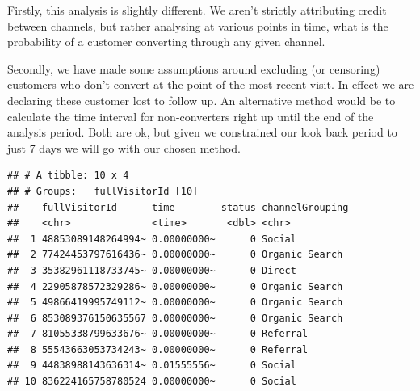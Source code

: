 \documentclass[]{book}
\newenvironment{Shaded}{\begin{snugshade}}{\end{snugshade}}
\newcommand{\KeywordTok}[1]{\textcolor[rgb]{0.13,0.29,0.53}{\textbf{#1}}}
\newcommand{\DataTypeTok}[1]{\textcolor[rgb]{0.13,0.29,0.53}{#1}}
\newcommand{\DecValTok}[1]{\textcolor[rgb]{0.00,0.00,0.81}{#1}}
\newcommand{\StringTok}[1]{\textcolor[rgb]{0.31,0.60,0.02}{#1}}
\newcommand{\OperatorTok}[1]{\textcolor[rgb]{0.81,0.36,0.00}{\textbf{#1}}}
\newcommand{\NormalTok}[1]{#1}
\begin{document}
Firstly, this analysis is slightly different. We aren't strictly
attributing credit between channels, but rather analysing at various
points in time, what is the probability of a customer converting through
any given channel.

Secondly, we have made some assumptions around excluding (or censoring)
customers who don't convert at the point of the most recent visit. In
effect we are declaring these customer lost to follow up. An alternative
method would be to calculate the time interval for non-converters right
up until the end of the analysis period. Both are ok, but given we
constrained our look back period to just 7 days we will go with our
chosen method.

\begin{Shaded}
\end{Shaded}

\begin{verbatim}
## # A tibble: 10 x 4
## # Groups:   fullVisitorId [10]
##    fullVisitorId      time        status channelGrouping
##    <chr>              <time>       <dbl> <chr>          
##  1 48853089148264994~ 0.00000000~      0 Social         
##  2 77424453797616436~ 0.00000000~      0 Organic Search 
##  3 35382961118733745~ 0.00000000~      0 Direct         
##  4 22905878572329286~ 0.00000000~      0 Organic Search 
##  5 49866419995749112~ 0.00000000~      0 Organic Search 
##  6 853089376150635567 0.00000000~      0 Organic Search 
##  7 81055338799633676~ 0.00000000~      0 Referral       
##  8 55543663053734243~ 0.00000000~      0 Referral       
##  9 44838988143636314~ 0.01555556~      0 Social         
## 10 836224165758780524 0.00000000~      0 Social
\end{verbatim}
\end{document}
